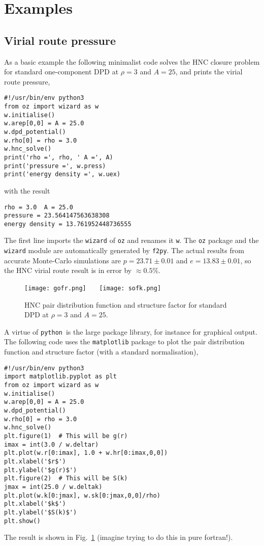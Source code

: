 \documentclass[12pt,a4paper]{article}
\newcommand{\FORTRAN}{{\sc fortran}}
\newcommand{\python}{{\tt python}}
\begin{document}
\section{Examples}
%
\subsection{Virial route pressure}
\label{sec:vrp}
%
As a basic example the following minimalist code solves the
HNC closure problem for standard one-component DPD at $\rho=3$ and
$A=25$, and prints the virial route pressure,
%
\begin{verbatim}
#!/usr/bin/env python3
from oz import wizard as w
w.initialise()
w.arep[0,0] = A = 25.0
w.dpd_potential()
w.rho[0] = rho = 3.0
w.hnc_solve()
print('rho =', rho, ' A =', A)
print('pressure =', w.press)
print('energy density =', w.uex)
\end{verbatim}
%
with the result
%
\begin{verbatim}
rho = 3.0  A = 25.0
pressure = 23.564147563638308
energy density = 13.761952448736555
\end{verbatim}
%
The first line imports the \verb+wizard+ of \verb+oz+ and renames it
\verb+w+.  The \verb+oz+ package and the \verb+wizard+ module are
automatically generated by \verb+f2py+.  The actual results from
accurate Monte-Carlo simulations are $p=23.71\pm0.01$ and
$e=13.83\pm0.01$, so the HNC virial route result is in error by
$\approx0.5$\%.

\begin{figure}
\begin{center}
\texttt{[image: gofr.png]}~~~%
\texttt{[image: sofk.png]}
\end{center}
\caption{HNC pair distribution function and structure factor for
  standard DPD at $\rho=3$ and $A=25$.\label{fig:gs}}
\end{figure}

A virtue of \python\ is the large package library, for instance for
graphical output.  The following code uses the \verb+matplotlib+
package to plot the pair distribution function and structure factor
(with a standard normalisation),
%
\begin{verbatim}
#!/usr/bin/env python3
import matplotlib.pyplot as plt
from oz import wizard as w
w.initialise()
w.arep[0,0] = A = 25.0
w.dpd_potential()
w.rho[0] = rho = 3.0
w.hnc_solve()
plt.figure(1)  # This will be g(r)
imax = int(3.0 / w.deltar)
plt.plot(w.r[0:imax], 1.0 + w.hr[0:imax,0,0])
plt.xlabel('$r$')
plt.ylabel('$g(r)$')
plt.figure(2)  # This will be S(k)
jmax = int(25.0 / w.deltak)
plt.plot(w.k[0:jmax], w.sk[0:jmax,0,0]/rho)
plt.xlabel('$k$')
plt.ylabel('$S(k)$')
plt.show()
\end{verbatim}
%
The result is shown in Fig.~\ref{fig:gs} (imagine trying to do this in
pure \FORTRAN!).
\end{document}
